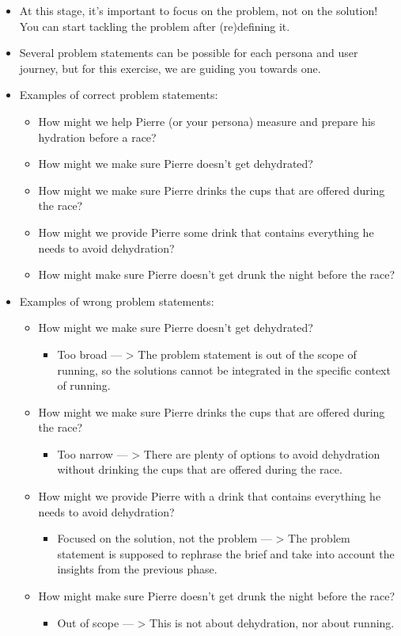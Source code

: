 \begin{itemize}
\item At this stage, it's important to focus on the problem, not on the solution! You can start tackling the problem after (re)defining it.
\item Several problem statements can be possible for each persona and user journey, but for this exercise, we are guiding you towards one.
\item Examples of correct problem statements: 
\begin{itemize}
\item How might we help Pierre (or your persona) measure and prepare his hydration before a race?
\item How might we make sure Pierre doesn't get dehydrated?
\item How might we make sure Pierre drinks the cups that are offered during the race?
\item How might we provide Pierre some drink that contains everything he needs to avoid dehydration?
\item How might make sure Pierre doesn't get drunk the night before the race?
\end{itemize}
\item Examples of wrong problem statements: 
\begin{itemize}
\item How might we make sure Pierre doesn't get dehydrated?
\begin{itemize}
\item Too broad  --- > The problem statement is out of the scope of running, so the solutions cannot be integrated in the specific context of running.
\end{itemize}
\item How might we make sure Pierre drinks the cups that are offered during the race?
\begin{itemize}
\item Too narrow  --- > There are plenty of options to avoid dehydration without drinking the cups that are offered during the race.
\end{itemize}
\item How might we provide Pierre with a drink that contains everything he needs to avoid dehydration?
\begin{itemize}
\item Focused on the solution, not the problem  --- > The problem statement is supposed to rephrase the brief and take into account the insights from the previous phase.
\end{itemize}
\item How might make sure Pierre doesn't get drunk the night before the race?
\begin{itemize}
\item Out of scope  --- > This is not about dehydration, nor about running.
\end{itemize}
\end{itemize}
\end{itemize}

